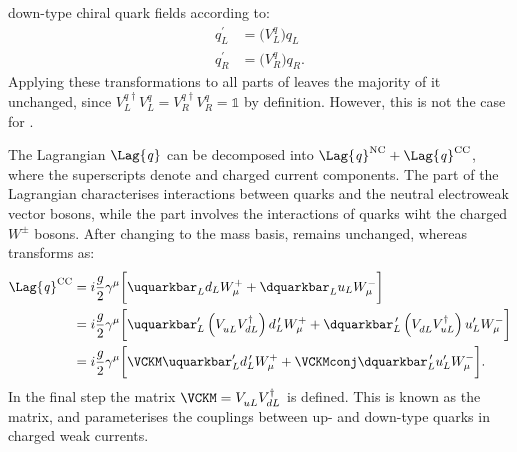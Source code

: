 down-type chiral quark fields according to:
\begin{align}
  q_L^\prime &= \big(V_L^q\big)q_{L}^{} \nonumber\\
  q_R^\prime &= \big(V_R^q\big)q_{R}^{}.
\end{align}
Applying these transformations to all parts of  leaves the majority of it unchanged, since
$V_{L}^{q\dagger} V_{L}^{q} = V_{R}^{q\dagger} V_{R}^{q} = \mathds{1}$ by definition.
However, this is not the case for .

The Lagrangian $\Lag{\it q}$ can be decomposed into
$\Lag{\it q}^\mathrm{NC}+\Lag{\it q}^\mathrm{CC}$, where the
superscripts denote \NC and charged current \CC components.
The \NC part of the Lagrangian characterises interactions between quarks and the neutral electroweak
vector bosons, while the \CC part involves the interactions of quarks wiht the charged $W^\pm$
bosons.
After changing to the mass basis,  remains unchanged, whereas 
transforms as:
\begin{align}
  \Lag{\it q}^\mathrm{CC}
  &= i\frac{g}{2}\gamma^\mu
  \bigg[\uquarkbar_Ld_LW^+_\mu + \dquarkbar_Lu_LW^-_\mu
  \bigg]  \nonumber\\
  &= i\frac{g}{2}\gamma^\mu
  \bigg[
    \uquarkbar_L^\prime\left(V_{uL}^{\phantom{\dagger}}V_{dL}^\dagger\right)d_L^{\,\prime} W^+_\mu +
    \dquarkbar_L^{\,\prime}\left(V_{dL}^{\phantom{\dagger}}V_{uL}^\dagger\right)u_L^\prime W^-_\mu
  \bigg]  \nonumber\\
  &= i\frac{g}{2}\gamma^\mu
  \bigg[
    \VCKM\uquarkbar_L^\prime d_L^{\,\prime} W^+_\mu +
    \VCKMconj\dquarkbar_L^{\,\prime} u_L^\prime W^-_\mu
  \bigg].
\end{align}
In the final step the matrix
$\VCKM=V^{\phantom{\dagger}}_{uL}V_{dL}^\dagger$ is defined.
This is known as the \ckm
matrix, and parameterises the couplings between up- and down-type quarks in charged weak currents.



